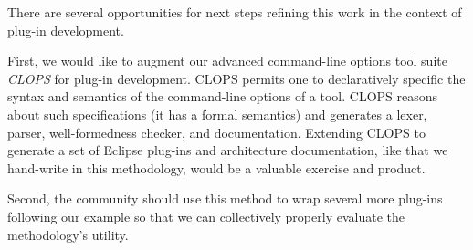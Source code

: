 \documentclass[conference]{IEEEtran}
\begin{document}
There are several opportunities for next steps refining this work in
the context of plug-in development.  

First, we would like to augment our advanced command-line options tool
suite \emph{CLOPS} for plug-in development.  CLOPS permits one to
declaratively specific the syntax and semantics of the command-line
options of a tool.  CLOPS reasons about such specifications (it has a
formal semantics) and generates a lexer, parser, well-formedness
checker, and documentation.  Extending CLOPS to generate a set of
Eclipse plug-ins and architecture documentation, like that we
hand-write in this methodology, would be a valuable exercise and
product.

Second, the community should use this method to wrap several more
plug-ins following our example so that we can collectively properly
evaluate the methodology's utility.






%
%
%
%





\end{document}
